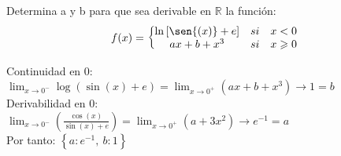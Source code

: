 \documentclass[addpoints,spanish, 12pt,a4paper]{exam}
\begin{document}
\begin{questions}
\addpoints


\question[5] Determina a y b para que sea derivable en $\mathbb{R}$ la función: $$f(x)=\left\{\begin{matrix}
\ln{\left[\sen{\left(x \right)} + e \right]} & si & x<0 \\
a x + b + x^{3} & si & x\geqslant 0 \\
\end{matrix}\right.$$ 


\begin{solution}
Continuidad en 0:\\ $\lim_{x \to 0^-} \log{\left(\sin{\left(x \right)} + e \right)} = \lim_{x \to 0^+}\left(a x + b + x^{3}\right) \to 1 = b $ \\ Derivabilidad en 0: \\ $\lim_{x \to 0^-}\left(\frac{\cos{\left(x \right)}}{\sin{\left(x \right)} + e}\right) = \lim_{x \to 0^+}\left(a + 3 x^{2}\right) \to e^{-1} = a $ \\ Por tanto: $\left\{ a : e^{-1}, \  b : 1\right\} $ \\ 
\end{solution}

\addpoints



\end{questions}
\end{document}
